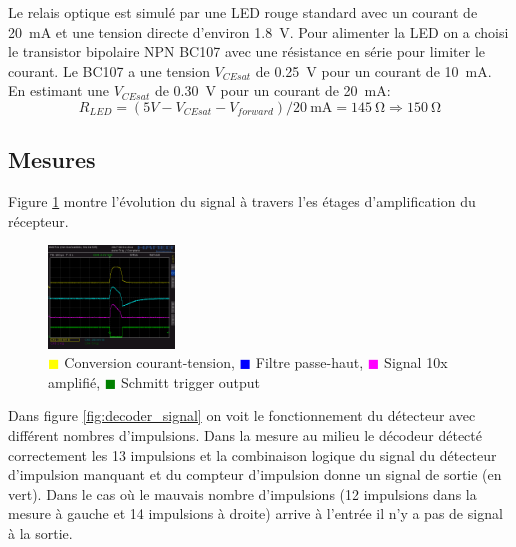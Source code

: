 \documentclass[french]{layout/Report}
\begin{document}
\begin{description}[leftmargin=!,labelwidth=4cm, labelindent=\parindent]
	\item[Relais] Le relais optique est simulé par une LED rouge standard avec un courant de \SI{20}{\milli\ampere} et une tension directe d'environ \SI{1.8}{\volt}. Pour alimenter la LED on a choisi le transistor bipolaire NPN BC107 avec une résistance en série pour limiter le courant.
		Le BC107 a une tension \(V_{CEsat}\) de \SI{0.25}{\volt} pour un courant de \SI{10}{\milli\ampere}.
		En estimant une \(V_{CEsat}\) de \SI{0.30}{\volt} pour un courant de \SI{20}{\milli\ampere}:
        \begin{equation*}
        R_{LED} = (5V - V_{CEsat} - V_{forward})/\SI{20}{\milli\ampere} = \SI{145}{\ohm} \Rightarrow \SI{150}{\ohm}
        \end{equation*}

\end{description}
\subsection{Mesures}

Figure \ref{fig:filter_signal} montre l'évolution du signal à travers l'es étages d'amplification du récepteur.

\begin{figure}[H]
\centering
\includegraphics[width=0.3\textwidth]{../measurements/SCR03}
\caption{
\textcolor{yellow}{$\blacksquare$} Conversion courant-tension,
\textcolor{blue}{$\blacksquare$} Filtre passe-haut,
\textcolor{magenta}{$\blacksquare$} Signal 10x amplifié,
\textcolor{green}{$\blacksquare$} Schmitt trigger output
}
\label{fig:filter_signal}
\end{figure}


Dans figure \ref{fig:decoder_signal} on voit le fonctionnement du détecteur avec différent nombres d'impulsions.
Dans la mesure au milieu le décodeur détecté correctement les 13 impulsions et la combinaison logique
du signal du détecteur d'impulsion manquant et du compteur d'impulsion donne un signal de sortie (en vert).
Dans le cas où le mauvais nombre  d'impulsions (12 impulsions dans la mesure à gauche et 14 impulsions à droite)
arrive à l'entrée il n'y a pas de signal à la sortie.
\end{document}

